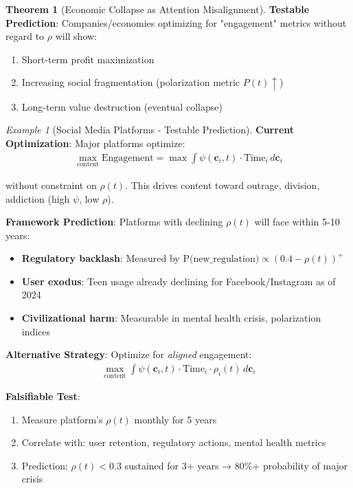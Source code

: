 \documentclass[11pt,a4paper]{article}
\theoremstyle{definition}
\newtheorem{theorem}{Theorem}[section]
\theoremstyle{remark}
\newtheorem{example}{Example}[section]
\newcommand{\cc}{\mathbf{c}}
\begin{document}
\begin{small}
\begin{theorem}[Economic Collapse as Attention Misalignment]
\textbf{Testable Prediction}: Companies/economies optimizing for "engagement" metrics without regard to \(\rho\) will show:
\begin{enumerate}
\item Short-term profit maximization
\item Increasing social fragmentation (polarization metric \(P(t) \uparrow\))
\item Long-term value destruction (eventual collapse)
\end{enumerate}
\end{theorem}

\begin{example}[Social Media Platforms - Testable Prediction]
\textbf{Current Optimization}: Major platforms optimize:
\begin{align}
\max_{\text{content}} \text{Engagement} = \max \int \psi(\cc_i, t) \cdot \text{Time}_i \, d\cc_i
\end{align}

without constraint on \(\rho(t)\). This drives content toward outrage, division, addiction (high \(\psi\), low \(\rho\)).

\textbf{Framework Prediction}: Platforms with declining \(\rho(t)\) will face within 5-10 years:
\begin{itemize}
\item \textbf{Regulatory backlash}: Measured by \(\text{P(new\_regulation)} \propto (0.4 - \rho(t))^+\)
\item \textbf{User exodus}: Teen usage already declining for Facebook/Instagram as of 2024
\item \textbf{Civilizational harm}: Measurable in mental health crisis, polarization indices
\end{itemize}

\textbf{Alternative Strategy}: Optimize for \textit{aligned} engagement:
\begin{align}
\max_{\text{content}} \int \psi(\cc_i, t) \cdot \text{Time}_i \cdot \rho_i(t) \, d\cc_i
\end{align}

\textbf{Falsifiable Test}: 
\begin{enumerate}
    \item Measure platform's \(\rho(t)\) monthly for 5 years
    \item Correlate with: user retention, regulatory actions, mental health metrics
    \item Prediction: \(\rho(t) < 0.3\) sustained for 3+ years → 80\%+ probability of major crisis
\end{enumerate}


\end{example}
\end{small}
\end{document}
